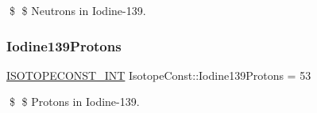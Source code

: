\$ \$ Neutrons in Iodine-\/139. \mbox{\label{group___isotope_const-_iodine-_i139_ga14828ad9761bfbaa4c067b53f44668b9}} 
\subsubsection{\texorpdfstring{Iodine139\+Protons}{Iodine139Protons}}
{\footnotesize\ttfamily \mbox{\hyperlink{group___isotope_const-_macros_ga5f18360b3e99483a35c32d789e62621c}{I\+S\+O\+T\+O\+P\+E\+C\+O\+N\+S\+T\+\_\+\+I\+NT}} Isotope\+Const\+::\+Iodine139\+Protons = 53}

\$ \$ Protons in Iodine-\/139. 